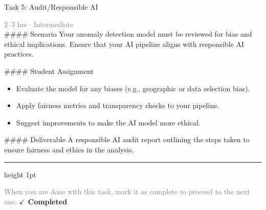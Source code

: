 \documentclass[10pt,a4paper]{article}
\begin{document}
\begin{taskbox}{Task 5: Audit/Responsible AI}

    {\small \textcolor{gray}{2--3 hrs $\cdot$ Intermediate}}\\[12pt]

    \#\#\#\# Scenario  
Your anomaly detection model must be reviewed for bias and ethical implications. Ensure that your AI pipeline aligns with responsible AI practices.  

\#\#\#\# Student Assignment  
\begin{itemize}
    \item Evaluate the model for any biases (e.g., geographic or data selection bias).  
    \item Apply fairness metrics and transparency checks to your pipeline.  
    \item Suggest improvements to make the AI model more ethical.  
\end{itemize}

\#\#\#\# Deliverable  
A responsible AI audit report outlining the steps taken to ensure fairness and ethics in the analysis.\par

    \vspace{16pt}

    \textcolor{cardBorder}{\hrule height 1pt}\vspace{8pt}

    \small \textcolor{gray}{When you are done with this task, mark it as complete to proceed to the next one.} \hfill \textbf{\textcolor{brandDark}{$\checkmark$ Completed}}

\end{taskbox}
\end{document}
